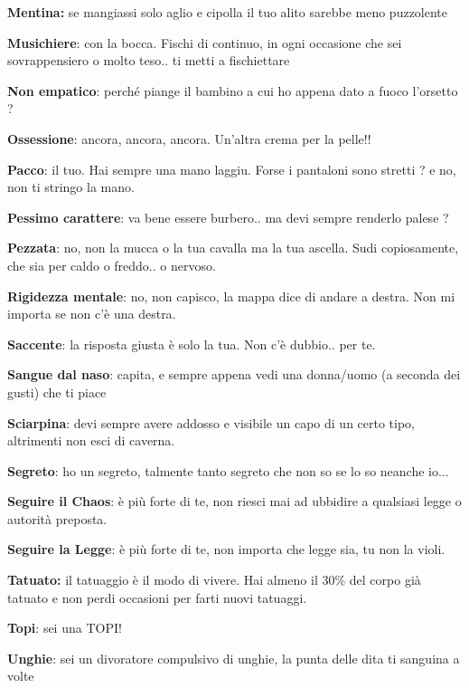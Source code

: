 \documentclass[a4paper,11pt,twoside,openany]{book}
\begin{document}
\textbf{Mentina:} se mangiassi solo aglio e cipolla il tuo alito sarebbe meno puzzolente

\textbf{Musichiere}: con la bocca. Fischi di continuo, in ogni occasione che sei sovrappensiero o molto teso.. ti metti a fischiettare

\textbf{Non empatico}: perché piange il bambino a cui ho appena dato a fuoco l'orsetto ?

\textbf{Ossessione}: ancora, ancora, ancora. Un'altra crema per la pelle!!

\textbf{Pacco}: il tuo. Hai sempre una mano laggiu. Forse i pantaloni sono stretti ? e no, non ti stringo la mano.

\textbf{Pessimo carattere}: va bene essere burbero.. ma devi sempre renderlo palese ?

\textbf{Pezzata}: no, non la mucca o la tua cavalla ma la tua ascella. Sudi copiosamente, che sia per caldo o freddo.. o nervoso.

\textbf{Rigidezza mentale}: no, non capisco, la mappa dice di andare a destra. Non mi importa se non c'è una destra.

\textbf{Saccente}: la risposta giusta è solo la tua. Non c'è dubbio.. per te.

\textbf{Sangue dal naso}: capita, e sempre appena vedi una donna/uomo (a seconda dei gusti) che ti piace

\textbf{Sciarpina}: devi sempre avere addosso e visibile un capo di un certo tipo, altrimenti non esci di caverna.

\textbf{Segreto}: ho un segreto, talmente tanto segreto che non so se lo so neanche io...

\textbf{Seguire il Chaos}: è più forte di te, non riesci mai ad ubbidire a qualsiasi legge o autorità preposta.

\textbf{Seguire la Legge}: è più forte di te, non importa che legge sia, tu non la violi.

\textbf{Tatuato:} il tatuaggio è il modo di vivere. Hai almeno il 30\% del corpo già tatuato e non perdi occasioni per farti nuovi tatuaggi.

\textbf{Topi}: sei una TOPI!

\textbf{Unghie}: sei un divoratore compulsivo di unghie, la punta delle dita ti sanguina a volte
\end{document}
